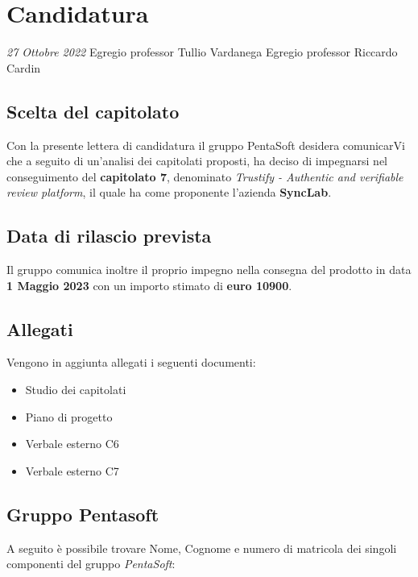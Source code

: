 \section{Candidatura}\label{section:candidatura}

\textit{27 Ottobre 2022} \newline
Egregio professor Tullio Vardanega \newline
Egregio professor Riccardo Cardin

\vspace{10pt}

\subsection{Scelta del capitolato}

Con la presente lettera di candidatura il gruppo PentaSoft desidera comunicarVi che a seguito di un’analisi dei capitolati proposti, ha deciso di impegnarsi nel conseguimento del \textbf{capitolato 7}, denominato \textit{Trustify - Authentic and verifiable review platform}, il quale ha come proponente l’azienda \textbf{SyncLab}.

\subsection{Data di rilascio prevista}
Il gruppo comunica inoltre il proprio impegno nella consegna del prodotto in data \textbf{1 Maggio 2023} con un importo stimato di \textbf{euro 10900}.

\subsection{Allegati}

Vengono in aggiunta allegati i seguenti documenti:

    \begin{itemize}
        \item Studio dei capitolati
        \item Piano di progetto
        \item Verbale esterno C6
        \item Verbale esterno C7
    \end{itemize}

\subsection{Gruppo Pentasoft}

A seguito è possibile trovare Nome, Cognome e numero di matricola dei singoli componenti del gruppo \textit{PentaSoft}:


